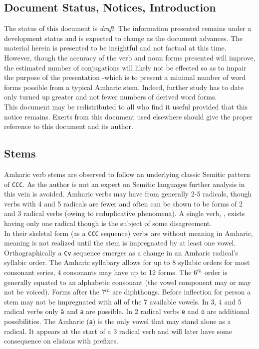 \documentclass[a4paper]{report}
\begin{document}
\subsection*{Document Status, Notices, Introduction}

The status of this document is \textit{draft}.  The information presented remains under a development status and is expected to change as the document advances.  The material herein is presented to be insightful and not factual at this time.  However, though the accuracy of the verb and noun forms presented will improve, the estimated number of conjugations will likely not be effected so as to impair the purpose of the presentation -which is to present a minimal number of word forms possible from a typical Amharic stem.  Indeed, further study has to date only turned up greater and not fewer numbers of derived word forms.\\

This document may be redistributed to all who find it useful provided that this notice remains.  Exerts from this document used elsewhere should give the proper reference to this
document and its author.\\



\subsection*{Stems}

Amharic verb stems are observed to follow an underlying classic Semitic
pattern of \texttt{CCC}.  As the author is not an expert on Semitic languages
further analysis in this vein is avoided.  Amharic verbs may have from generally 2-5 radicals, though verbs with 4 and 5 radicals are fewer and often can be shown to be forms of 2 and 3 radical verbs (owing to reduplicative phenomena). A single verb, {\xaG}, exists having only one radical though is the subject of some disagreement.\\

In their skeletal form (as a \texttt{CCC} sequence) verbs are without meaning in Amharic, meaning is not realized until the stem is impregnated by at least one vowel.  Orthographically a \texttt{Cv} sequence emerges as a change in an Amharic radical's syllabic order.  The Amharic syllabary allows for up to 8 syllabic orders for most consonant series, 4 consonants may have up to 12 forms.  The 6$^{th}$ order is generally equated to an alphabetic consonant (the vowel component may or may not be voiced). Forms after the 7$^{th}$ are diphthongs.  Before inflection for person a stem may not be impregnated with all of the 7 available vowels.  In 3, 4 and 5 radical verbs only \texttt{\"{a}} and \texttt{a} are possible.  In 2 radical verbs \texttt{e} and \texttt{o} are additional possibilities.  The Amharic {\eG} (\texttt{a}) is the only vowel that may stand alone as a radical.  It appears at the start of a 3 radical verb and will later have some consequence on elisions with prefixes.\\
\end{document}
